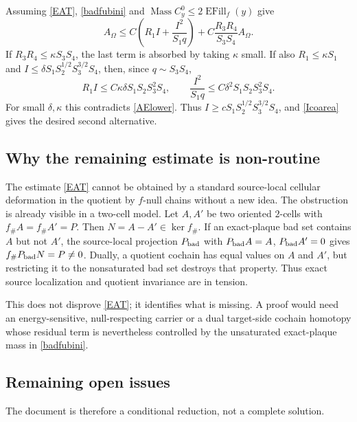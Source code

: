 \documentclass[12pt]{article}
\newcommand{\Mass}{\operatorname{Mass}}
\newcommand{\EFill}{\operatorname{EFill}}
\begin{document}
Assuming \eqref{EAT}, \eqref{badfubini} and
\(\Mass C_y^0\le2\EFill_f(y)\) give
\[
A_\Omega\le C\left(R_1I+\frac{I^2}{S_1q}\right)
  +C\frac{R_3R_4}{S_3S_4}A_\Omega .
\]
If \(R_3R_4\le\kappa S_3S_4\), the last term is absorbed by taking
\(\kappa\) small.  If also \(R_1\le\kappa S_1\) and
\(I\le\delta S_1S_2^{1/2}S_3^{3/2}S_4\), then, since \(q\sim S_3S_4\),
\[
R_1I\le C\kappa\delta S_1S_2S_3^2S_4,\qquad
\frac{I^2}{S_1q}\le C\delta^2S_1S_2S_3^2S_4 .
\]
For small \(\delta,\kappa\) this contradicts \eqref{AElower}.  Thus
\(I\ge cS_1S_2^{1/2}S_3^{3/2}S_4\), and \eqref{Icoarea} gives the desired
second alternative.

\subsection*{Why the remaining estimate is non-routine}

The estimate \eqref{EAT} cannot be obtained by a standard source-local
cellular deformation in the quotient by \(f\)-null chains without a new idea.
The obstruction is already visible in a two-cell model.  Let \(A,A'\) be two
oriented \(2\)-cells with \(f_\#A=f_\#A'=P\).  Then \(N=A-A'\in\ker f_\#\).
If an exact-plaque bad set contains \(A\) but not \(A'\), the source-local
projection \(P_{\rm bad}\) with \(P_{\rm bad}A=A\), \(P_{\rm bad}A'=0\) gives
\(f_\#P_{\rm bad}N=P\ne0\).  Dually, a quotient cochain has equal values on
\(A\) and \(A'\), but restricting it to the nonsaturated bad set destroys that
property.  Thus exact source localization and quotient invariance are in
tension.

This does not disprove \eqref{EAT}; it identifies what is missing.  A proof
would need an energy-sensitive, null-respecting carrier or a dual target-side
cochain homotopy whose residual term is nevertheless controlled by the
unsaturated exact-plaque mass in \eqref{badfubini}.

\subsection*{Remaining open issues}

The document is therefore a conditional reduction, not a complete solution.
\end{document}
